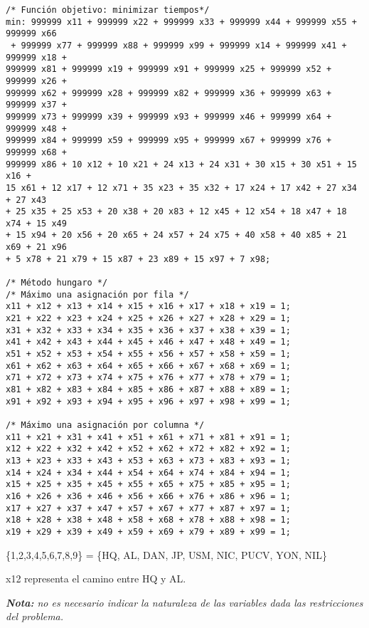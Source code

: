 \documentclass[12pt,letterpaper]{article}
\begin{document}
\begin{verbatim}
/* Función objetivo: minimizar tiempos*/
min: 999999 x11 + 999999 x22 + 999999 x33 + 999999 x44 + 999999 x55 + 999999 x66
 + 999999 x77 + 999999 x88 + 999999 x99 + 999999 x14 + 999999 x41 + 999999 x18 +
999999 x81 + 999999 x19 + 999999 x91 + 999999 x25 + 999999 x52 + 999999 x26 +
999999 x62 + 999999 x28 + 999999 x82 + 999999 x36 + 999999 x63 + 999999 x37 +
999999 x73 + 999999 x39 + 999999 x93 + 999999 x46 + 999999 x64 + 999999 x48 +
999999 x84 + 999999 x59 + 999999 x95 + 999999 x67 + 999999 x76 + 999999 x68 +
999999 x86 + 10 x12 + 10 x21 + 24 x13 + 24 x31 + 30 x15 + 30 x51 + 15 x16 +
15 x61 + 12 x17 + 12 x71 + 35 x23 + 35 x32 + 17 x24 + 17 x42 + 27 x34 + 27 x43
+ 25 x35 + 25 x53 + 20 x38 + 20 x83 + 12 x45 + 12 x54 + 18 x47 + 18 x74 + 15 x49
+ 15 x94 + 20 x56 + 20 x65 + 24 x57 + 24 x75 + 40 x58 + 40 x85 + 21 x69 + 21 x96
+ 5 x78 + 21 x79 + 15 x87 + 23 x89 + 15 x97 + 7 x98; 

/* Método hungaro */
/* Máximo una asignación por fila */
x11 + x12 + x13 + x14 + x15 + x16 + x17 + x18 + x19 = 1;
x21 + x22 + x23 + x24 + x25 + x26 + x27 + x28 + x29 = 1;
x31 + x32 + x33 + x34 + x35 + x36 + x37 + x38 + x39 = 1;
x41 + x42 + x43 + x44 + x45 + x46 + x47 + x48 + x49 = 1;
x51 + x52 + x53 + x54 + x55 + x56 + x57 + x58 + x59 = 1;
x61 + x62 + x63 + x64 + x65 + x66 + x67 + x68 + x69 = 1;
x71 + x72 + x73 + x74 + x75 + x76 + x77 + x78 + x79 = 1;
x81 + x82 + x83 + x84 + x85 + x86 + x87 + x88 + x89 = 1;
x91 + x92 + x93 + x94 + x95 + x96 + x97 + x98 + x99 = 1;

/* Máximo una asignación por columna */
x11 + x21 + x31 + x41 + x51 + x61 + x71 + x81 + x91 = 1;
x12 + x22 + x32 + x42 + x52 + x62 + x72 + x82 + x92 = 1;
x13 + x23 + x33 + x43 + x53 + x63 + x73 + x83 + x93 = 1;
x14 + x24 + x34 + x44 + x54 + x64 + x74 + x84 + x94 = 1;
x15 + x25 + x35 + x45 + x55 + x65 + x75 + x85 + x95 = 1;
x16 + x26 + x36 + x46 + x56 + x66 + x76 + x86 + x96 = 1;
x17 + x27 + x37 + x47 + x57 + x67 + x77 + x87 + x97 = 1;
x18 + x28 + x38 + x48 + x58 + x68 + x78 + x88 + x98 = 1;
x19 + x29 + x39 + x49 + x59 + x69 + x79 + x89 + x99 = 1;
\end{verbatim}

\{1,2,3,4,5,6,7,8,9\} = \{HQ, AL, DAN, JP, USM, NIC, PUCV, YON, NIL\}

x12 representa el camino entre HQ y AL.

\textit{\textbf{Nota:} no es necesario indicar la naturaleza de las variables dada las restricciones del problema.}
\\
\end{document}
